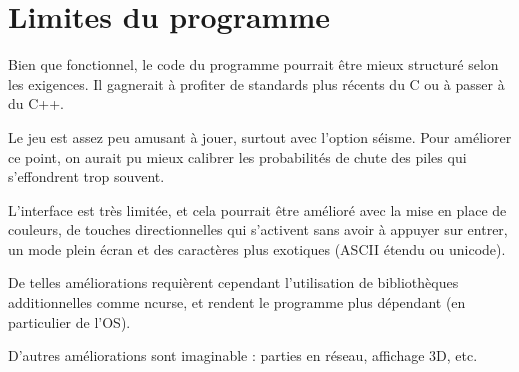 \documentclass[a4paper, titlepage]{article}
\begin{document}
\section{Limites du programme}
Bien que fonctionnel, le code du programme pourrait être mieux structuré selon les exigences. Il gagnerait à profiter de standards plus récents du C ou à passer à du C++.

Le jeu est assez peu amusant à jouer, surtout avec l'option séisme.
Pour améliorer ce point, on aurait pu mieux calibrer les probabilités de chute des piles qui s'effondrent trop souvent. 

L'interface est très limitée, et cela pourrait être amélioré avec la mise en place de couleurs, de touches directionnelles qui s'activent sans avoir à appuyer sur entrer, un mode plein écran et des caractères plus exotiques (ASCII étendu ou unicode).

De telles améliorations requièrent cependant l'utilisation de bibliothèques additionnelles comme ncurse, et rendent le programme plus dépendant (en particulier de l'OS).

D'autres améliorations sont imaginable : parties en réseau, affichage 3D, etc.
\end{document}
